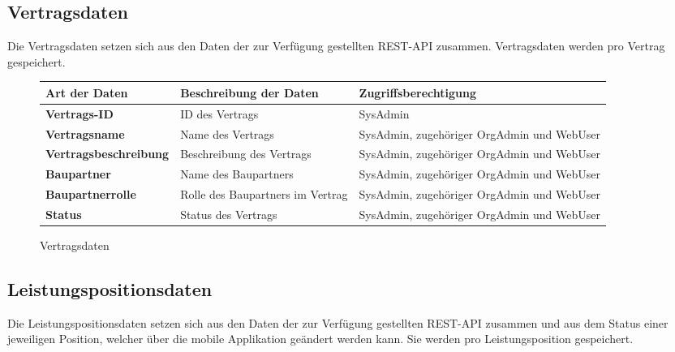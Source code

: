 \subsection{Vertragsdaten}

Die Vertragsdaten setzen sich aus den Daten der zur Verf\"ugung gestellten REST-API zusammen. Vertragsdaten werden pro Vertrag gespeichert.

\begin{figure}[h]
	\centering
	\begin{tabularx}{\textwidth}{| X || X | X |}
        \hline
		\textbf{Art der Daten} & \textbf{Beschreibung der Daten} & \textbf{Zugriffsberechtigung} \\ \hline \hline
		\textbf{Vertrags-ID} & ID des Vertrags & SysAdmin \\ \hline
		\textbf{Vertragsname} & Name des Vertrags & SysAdmin, zugehöriger OrgAdmin und WebUser \\ \hline
        \textbf{Vertragsbeschreibung} & Beschreibung des Vertrags & SysAdmin, zugehöriger OrgAdmin und WebUser \\ \hline
        \textbf{Baupartner} & Name des Baupartners & SysAdmin, zugehöriger OrgAdmin und WebUser \\ \hline
        \textbf{Baupartnerrolle} & Rolle des Baupartners im Vertrag & SysAdmin, zugehöriger OrgAdmin und WebUser \\ \hline
        \textbf{Status} & Status des Vertrags & SysAdmin, zugehöriger OrgAdmin und WebUser \\ \hline
	\end{tabularx}
	\caption{Vertragsdaten}
	\label{fig:Vertragsdaten}
\end{figure}

\newpage

\subsection{Leistungspositionsdaten}

Die Leistungspositionsdaten setzen sich aus den Daten der zur Verf\"ugung gestellten REST-API zusammen und aus dem Status einer jeweiligen Position, welcher über die mobile Applikation geändert werden kann.
Sie werden pro Leistungsposition gespeichert.

